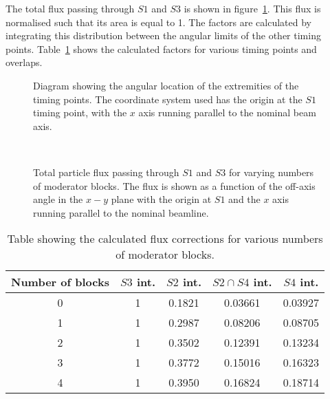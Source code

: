     \begin{figure}[h]
      
    \end{figure}
    
    The total flux passing through $\mathit{S1}$ and $\mathit{S3}$ is shown in figure~\ref{fig:s1s3all}.
    This flux is normalised such that its area is equal to 1.
    The factors are calculated by integrating this distribution between the angular limits of the other timing points.
    Table~\ref{tab:fluxFactors} shows the calculated factors for various timing points and overlaps.
    
    \begin{figure}[h]
      \begin{minipage}{0.49\textwidth}
	\begin{adjustbox}{max totalsize={\textwidth}{.5\textheight}}
	  
	\end{adjustbox}
	\centering
	\caption{Diagram showing the angular location of the extremities of the timing points. The coordinate system used has the origin at the $\mathit{S1}$ timing point, with the $x$ axis running parallel to the nominal beam axis.}
	\label{fig:beamAng}
      \end{minipage}
      \hfill
      \begin{minipage}{0.49\textwidth}
	\begin{adjustbox}{max totalsize={\textwidth}{0.5\textheight}, center}
	  
	\end{adjustbox}
	\caption{Total particle flux passing through $\mathit{S1}$ and $\mathit{S3}$ for varying numbers of moderator blocks. The flux is shown as a function of the off-axis angle in the $x-y$ plane with the origin at $\mathit{S1}$ and the $x$ axis running parallel to the nominal beamline.}
	\label{fig:s1s3all}
      \end{minipage}
      \
    \end{figure}
    
    \begin{table}
      \centering
      \begin{tabular}{|c|c|c|c|c|}
	\hline
	Number of blocks & $\mathit{S3}$ int. & $\mathit{S2}$ int. & $\mathit{S2} \cap \mathit{S4}$ int. & $\mathit{S4}$ int. \\
	\hline
	0 & 1 & 0.1821 & 0.03661 & 0.03927 \\
	1 & 1 & 0.2987 & 0.08206 & 0.08705 \\
	2 & 1 & 0.3502 & 0.12391 & 0.13234 \\
	3 & 1 & 0.3772 & 0.15016 & 0.16323 \\
	4 & 1 & 0.3950 & 0.16824 & 0.18714 \\
	\hline		
      \end{tabular}
      \caption{Table showing the calculated flux corrections for various numbers of moderator blocks.}
      \label{tab:fluxFactors}
    \end{table}
    
